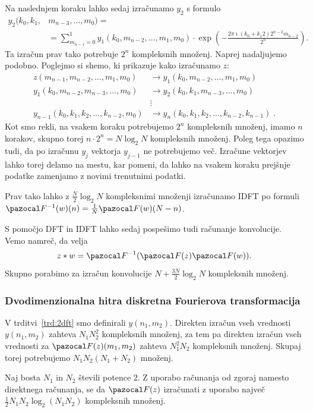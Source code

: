 Na naslednjem koraku lahko sedaj izračunamo $y_2$ s formulo
\begin{align*}
  y_2(k_0, k_1, & m_{n-3},  \ldots, m_0) = \\
  & = \sum_{m_{n-1}=0}^{1} y_1(k_0, m_{n-2},\ldots,m_1,m_0) \cdot \exp\left(-\frac{2\pi\imath (k_0 + k_1 2) 2^{n-2}m_{n-2}}{2^n}\right).
\end{align*}
%
Ta izračun prav tako potrebuje $2^n$ kompleksnih množenj. Naprej nadaljujemo podobno. Poglejmo si shemo, ki prikazuje kako izračunamo $z$:
%
\begin{align*}
 z(m_{n-1}, m_{n-2}, \ldots, m_1, m_0) & \to y_1(k_0, m_{n-2}, \ldots, m_1, m_0) \\
 y_1(k_0, m_{n-2}, m_{n-3},\ldots, m_0) & \to y_2(k_0, k_1, m_{n-3}, \ldots, m_0) \\
 & \vdots \\
 y_{n-1}(k_0, k_1, k_2, \ldots, k_{n-2}, m_0) & \to y_n(k_0, k_1, k_2, \ldots, k_{n-2}, k_{n-1}) \;.
\end{align*}
%
Kot smo rekli, na vsakem koraku potrebujemo $2^n$ kompleksnih množenj, imamo $n$ korakov, skupno torej $n\cdot 2^n = N \log_2N$ kompleksnih množenj. Poleg tega opazimo tudi, da po izračunu $y_{j}$ vektorja $y_{j-1}$ ne potrebujemo več. Izračune vektorjev lahko torej delamo na mestu, kar pomeni, da lahko na vsakem koraku prejšnje podatke zamenjamo z novimi trenutnimi podatki.

Prav tako lahko z $\frac{N}{2} \log_2N$ kompleksnimi množenji izračunamo IDFT po formuli $\F^{-1}(w)(n) = \frac{1}{N} \F(w)(N-n)$.

S pomočjo DFT in IDFT lahko sedaj pospešimo tudi računanje konvolucije. Vemo namreč, da velja
$$z \ast w = \F^{-1}(\F(z)\F(w)).$$
Skupno porabimo za izračun konvolucije $N + \frac{3N}{2}\log_2N$ kompleksnih množenj.
%
\subsubsection{Dvodimenzionalna hitra diskretna Fourierova transformacija}
V trditvi~\ref{trd:2dft} smo definirali $y(n_1, m_2)$. Direkten izračun vseh vrednosti $y(n_1, m_2)$ zahteva $N_1 N_2^2$ kompleksnih množenj, za tem pa direkten izračun vseh vrednosti za $\F(z)(m_1, m_2)$ zahteva $N_1^2 N_2$ kompleksnih množenj. Skupaj torej potrebujemo $N_1 N_2 (N_1 + N_2)$ množenj.
%
\begin{trditev}
Naj bosta $N_1$ in $N_2$ števili potence 2. Z uporabo računanja od zgoraj namesto direktnega računanja, se da $\F(z)$ izračunati z uporabo največ $\frac{1}{2} N_1 N_2 \log_2(N_1 N_2)$ kompleksnih množenj.  
\end{trditev}
%
